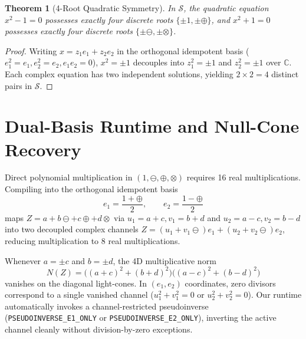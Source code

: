 \documentclass[11pt,a4paper]{article}
\newtheorem{theorem}{Theorem}
\begin{document}

\begin{theorem}[4-Root Quadratic Symmetry]
In $\mathcal{S}$, the quadratic equation $x^2 - 1 = 0$ possesses exactly four discrete roots $\{\pm 1, \pm \oplus\}$, and $x^2 + 1 = 0$ possesses exactly four discrete roots $\{\pm \ominus, \pm \otimes\}$.
\end{theorem}
\begin{proof}
Writing $x = z_1 e_1 + z_2 e_2$ in the orthogonal idempotent basis ($e_1^2 = e_1, e_2^2 = e_2, e_1 e_2 = 0$), $x^2 = \pm 1$ decouples into $z_1^2 = \pm 1$ and $z_2^2 = \pm 1$ over $\mathbb{C}$. Each complex equation has two independent solutions, yielding $2 \times 2 = 4$ distinct pairs in $\mathcal{S}$.
\end{proof}

\section{Dual-Basis Runtime and Null-Cone Recovery}
Direct polynomial multiplication in $(1, \ominus, \oplus, \otimes)$ requires 16 real multiplications. Compiling into the orthogonal idempotent basis
\begin{equation}
e_1 = \frac{1 + \oplus}{2}, \qquad e_2 = \frac{1 - \oplus}{2}
\end{equation}
maps $Z = a + b\ominus + c\oplus + d\otimes$ via $u_1 = a+c, v_1 = b+d$ and $u_2 = a-c, v_2 = b-d$ into two decoupled complex channels $Z = (u_1 + v_1\ominus)e_1 + (u_2 + v_2\ominus)e_2$, reducing multiplication to 8 real multiplications.

Whenever $a = \pm c$ and $b = \pm d$, the 4D multiplicative norm
\begin{equation}
N(Z) = \big((a+c)^2 + (b+d)^2\big)\big((a-c)^2 + (b-d)^2\big)
\end{equation}
vanishes on the diagonal light-cones. In $(e_1, e_2)$ coordinates, zero divisors correspond to a single vanished channel ($u_1^2 + v_1^2 = 0$ or $u_2^2 + v_2^2 = 0$). Our runtime automatically invokes a channel-restricted pseudoinverse (\texttt{PSEUDOINVERSE\_E1\_ONLY} or \texttt{PSEUDOINVERSE\_E2\_ONLY}), inverting the active channel cleanly without division-by-zero exceptions.
\end{document}
